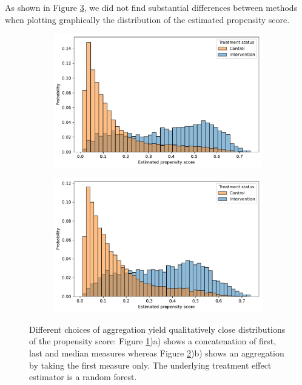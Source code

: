 \documentclass[french,12pt,twoside,a4paper]{book}
\begin{document}
\begin{appendices}
  As shown in Figure \ref{apd:fig:albumin_for_sepsis:overlap_measure}, we did not find substantial differences between methods
  when plotting graphically the distribution of the estimated propensity score.

  \begin{figure}[h!]
    \centering
    \begin{subfigure}[b]{0.45\linewidth}
      \centering
      \includegraphics[width=\linewidth]{img/chapter_4/sensitivity__ps_distribution__first_last_median__Forests.pdf}
      \caption{}\label{apd:fig:albumin_for_sepsis:overlap_measure_first_last_median}
    \end{subfigure}
    \hfill
    \begin{subfigure}[b]{0.45\linewidth}
      \centering
      \includegraphics[width=\linewidth]{img/chapter_4/sensitivity__ps_distribution__first__Forests.pdf}
      \caption{}\label{apd:fig:albumin_for_sepsis:overlap_measure_first}
    \end{subfigure}
    \caption{Different choices of aggregation yield qualitatively close
      distributions of the propensity score: Figure
      \ref{apd:fig:albumin_for_sepsis:overlap_measure_first_last_median})a)
      shows a concatenation of first, last and median measures whereas Figure
      \ref{apd:fig:albumin_for_sepsis:overlap_measure_first})b) shows an
      aggregation by taking the first measure only. The underlying treatment
      effect estimator is a random
      forest.}\label{apd:fig:albumin_for_sepsis:overlap_measure}
  \end{figure}


\end{appendices}
\end{document}
